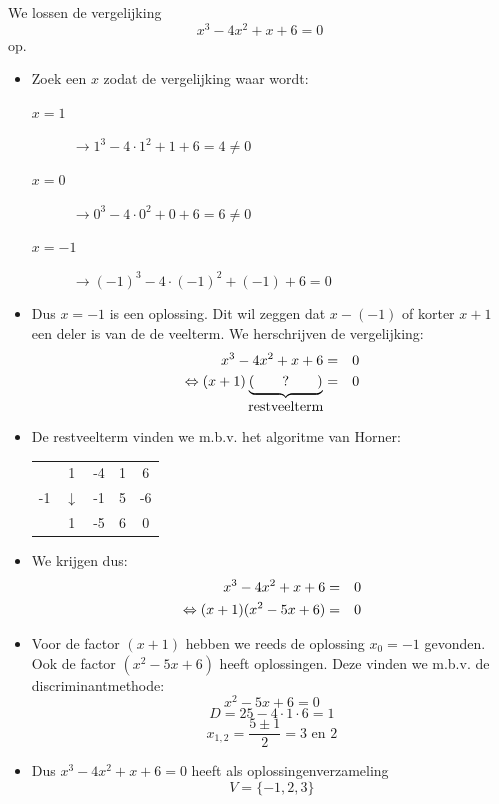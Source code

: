 \documentclass[12pt]{article}
\begin{document}
We lossen de vergelijking $$x^3-4x^2+x+6=0$$ op.

\begin{itemize}
  \item Zoek een $x$ zodat de vergelijking waar wordt:
  \begin{description}
    \item[$x=1$] $\rightarrow 1^3-4\cdot 1^2+1+6 = 4 \neq 0$
    \item[$x=0$] $\rightarrow 0^3-4\cdot 0^2+0+6 = 6 \neq 0$
    \item[$x=-1$] $\rightarrow (-1)^3-4\cdot (-1)^2+(-1)+6 = 0$
  \end{description}
  \item Dus $x=-1$ is een oplossing. Dit wil zeggen dat $x-(-1)$ of korter $x+1$ een deler is van de de veelterm. We herschrijven de vergelijking:
  \begin{eqnarray*}
    x^3-4x^2+x+6&=&0\\
    \Leftrightarrow (x+1)\underbrace{(\qquad ? \qquad)}_{\mbox{restveelterm}}&=&0\\
  \end{eqnarray*}
  \item De restveelterm vinden we m.b.v. het algoritme van Horner:
  \begin{center}
    \begin{tabular}{c|cccc}
      & 1 & -4 & 1 & 6\\
    -1 & $\downarrow$ & -1 & 5 & -6\\
    \hline
     & 1 & -5 & 6 & 0
    \end{tabular}
  \end{center}
  \item We krijgen dus:
    \begin{eqnarray*}
    x^3-4x^2+x+6&=&0\\
    \Leftrightarrow (x+1)(x^2-5x+6)&=&0\\
  \end{eqnarray*}
  \item Voor de factor $(x+1)$ hebben we reeds de oplossing $x_0=-1$ gevonden. Ook de factor $(x^2-5x+6)$ heeft oplossingen. Deze vinden we m.b.v. de discriminantmethode:
  $$x^2-5x+6=0$$
  $$D=25-4\cdot 1\cdot 6=1$$
  $$x_{1,2}=\dfrac{5\pm 1}{2}=3\mbox{ en }2$$
  \item Dus $x^3-4x^2+x+6=0$ heeft als oplossingenverzameling
  $$V=\{-1, 2, 3\}$$
\end{itemize}
\end{document}
